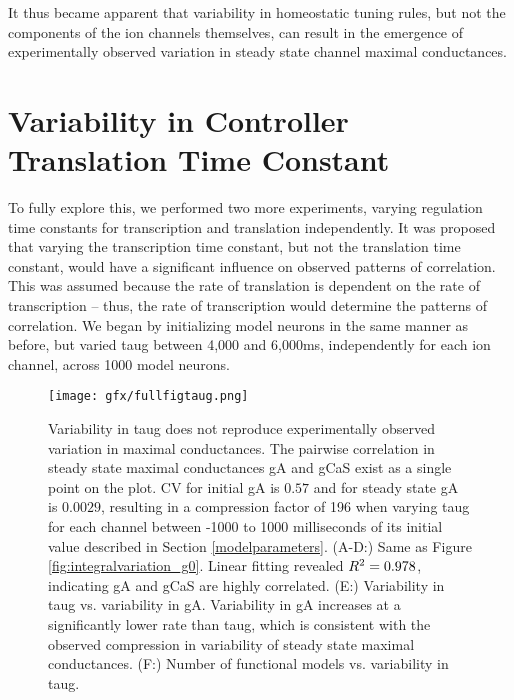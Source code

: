 It thus became apparent that variability in homeostatic tuning rules, but not the components of the ion channels themselves, can result in the emergence of experimentally observed variation in steady state channel maximal conductances.

\section{Variability in Controller Translation Time Constant}

To fully explore this, we performed two more experiments, varying regulation time constants for transcription and translation independently. It was proposed that varying the transcription time constant, but not the translation time constant, would have a significant influence on observed patterns of correlation. This was assumed because the rate of translation is dependent on the rate of transcription -- thus, the rate of transcription would determine the patterns of correlation. We began by initializing model neurons in the same manner as before, but varied \ac{taug} between 4,000 and 6,000ms, independently for each ion channel, across 1000 model neurons.

\begin{figure}[H]
    \centering
    \begin{addmargin}[-2cm]{-3cm}
    \texttt{[image: gfx/fullfigtaug.png]}
    \end{addmargin}
    \caption[Variability in \acs{taug} under integral control.]{Variability in \ac{taug} does not reproduce experimentally observed variation in maximal conductances. The pairwise correlation in steady state maximal conductances \ac{gA} and \ac{gCaS} exist as a single point on the plot. CV for initial \ac{gA} is $0.57$ and for steady state \ac{gA} is $0.0029$, resulting in a compression factor of 196 when varying \ac{taug} for each channel between -1000 to 1000 milliseconds of its initial value described in Section \ref{modelparameters}. (\textsc{A-D:}) Same as Figure \ref{fig:integralvariation_g0}. Linear fitting revealed \(R\textsuperscript{2} = 0.978\), indicating \ac{gA} and \ac{gCaS} are highly correlated. (\textsc{E:}) Variability in \ac{taug} vs. variability in \ac{gA}. Variability in \ac{gA} increases at a significantly lower rate than \ac{taug}, which is consistent with the observed compression in variability of steady state maximal conductances. (\textsc{F:}) Number of functional models vs. variability in \ac{taug}.}
    \label{fig:integralvariation_taug}
\end{figure}

